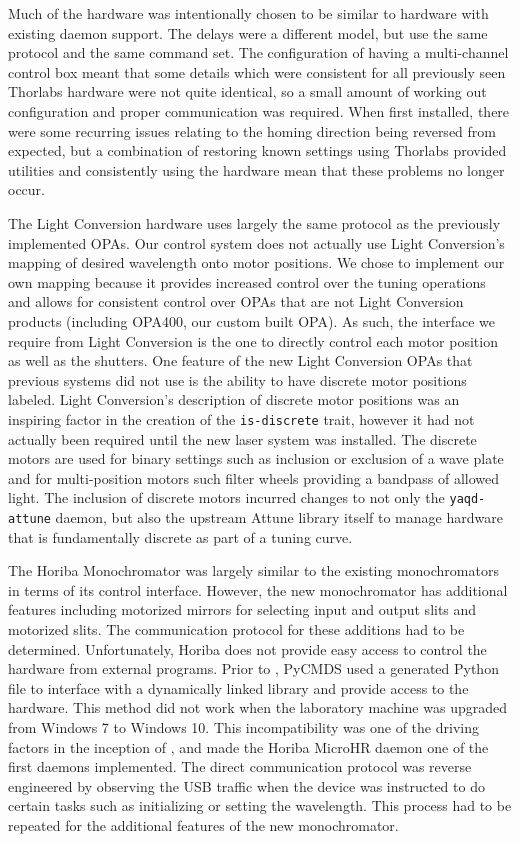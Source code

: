 Much of the hardware was intentionally chosen to be similar to hardware with existing \yaq{} daemon support.
The delays were a different model, but use the same protocol and the same command set.
The configuration of having a multi-channel control box meant that some details which were consistent for all previously seen Thorlabs hardware were not quite identical, so a small amount of working out configuration and proper communication was required.
When first installed, there were some recurring issues relating to the homing direction being reversed from expected, but a combination of restoring known settings using Thorlabs provided utilities and consistently using the hardware mean that these problems no longer occur.

The Light Conversion hardware uses largely the same protocol as the previously implemented OPAs.
Our control system does not actually use Light Conversion's mapping of desired wavelength onto motor positions.
We chose to implement our own mapping because it provides increased control over the tuning operations and allows for consistent control over OPAs that are not Light Conversion products (including OPA400, our custom built OPA).
As such, the interface we require from Light Conversion is the one to directly control each motor position as well as the shutters.
One feature of the new Light Conversion OPAs that previous systems did not use is the ability to have discrete motor positions labeled.
Light Conversion's description of discrete motor positions was an inspiring factor in the creation of the \texttt{is-discrete} \yaq{} trait, however it had not actually been required until the new laser system was installed.
The discrete motors are used for binary settings such as inclusion or exclusion of a wave plate and for multi-position motors such filter wheels providing a bandpass of allowed light.
The inclusion of discrete motors incurred changes to not only the \texttt{yaqd-attune}\cite{yaqd-attune} daemon, but also the upstream Attune library itself to manage hardware that is fundamentally discrete as part of a tuning curve.

The Horiba Monochromator was largely similar to the existing monochromators in terms of its control interface.
However, the new monochromator has additional features including motorized mirrors for selecting input and output slits and motorized slits.
The communication protocol for these additions had to be determined.
Unfortunately, Horiba does not provide easy access to control the hardware from external programs.
Prior to \yaq{}, PyCMDS used a generated Python file to interface with a dynamically linked library and provide access to the hardware.
This method did not work when the laboratory machine was upgraded from Windows 7 to Windows 10.
This incompatibility was one of the driving factors in the inception of \yaq{}, and made the Horiba MicroHR daemon one of the first daemons implemented.
The direct communication protocol was reverse engineered by observing the USB traffic when the device was instructed to do certain tasks such as initializing or setting the wavelength.
This process had to be repeated for the additional features of the new monochromator.

